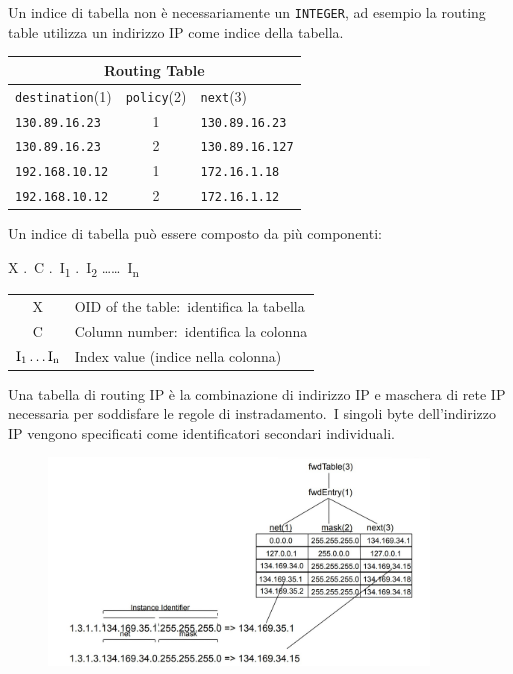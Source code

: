 Un indice di tabella non è necessariamente un \texttt{INTEGER}, ad esempio la routing table utilizza un indirizzo IP come indice della tabella.

\begin{table}[H]
    \centering
    \begin{tabular}{|l|c|l|}
        \hline
        \multicolumn{3}{|c|}{Routing Table}                                   \\\hline\hline
        \texttt{destination}(1) & \texttt{policy}(2) & \texttt{next}(3)       \\\hline
        \texttt{130.89.16.23}   & 1                  & \texttt{130.89.16.23}  \\
        \texttt{130.89.16.23}   & 2                  & \texttt{130.89.16.127} \\
        \texttt{192.168.10.12}  & 1                  & \texttt{172.16.1.18}   \\
        \texttt{192.168.10.12}  & 2                  & \texttt{172.16.1.12}   \\\hline
    \end{tabular}
\end{table}

\noindent Un indice di tabella può essere composto da più componenti:

\begin{center}
    X .\ C .\ I\textsubscript{1} .\ I\textsubscript{2} \dots\dots\ I\textsubscript{n}
\end{center}

\begin{table}[H]
    \centering
    \begin{tabular}{c l}
        X                   & OID of the table:\ identifica la tabella \\
        C                   & Column number:\ identifica la colonna    \\
        $\rm I_1 \dots I_n$ & Index value (indice nella colonna)       \\
    \end{tabular}
\end{table}

\noindent Una tabella di routing IP è la combinazione di indirizzo IP e maschera di rete IP necessaria per soddisfare le regole di instradamento.\
I singoli byte dell'indirizzo IP vengono specificati come identificatori secondari individuali.

\begin{figure}[H]
    \centering
    \includegraphics[width=0.9\textwidth]{immagini/RoutingTable.jpg}
\end{figure}

